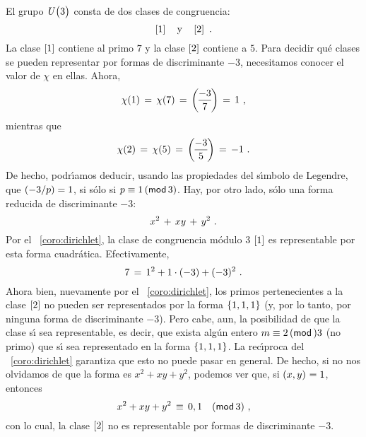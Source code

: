 \begin{ejemDirichlet}\label{ejem:dirichlet:representacion:tres}
	El grupo $\Unidadesmod[3]$ consta de dos clases de congruencia:
	\begin{displaymath}
		\clase 1\dispand\clase 2
		\dispstop
	\end{displaymath}
	La clase $\clase 1$ contiene al primo $7$ y la clase
	$\clase 2$ contiene a $5$. Para decidir qu\'e clases
	se pueden representar por formas de discriminante $-3$,
	necesitamos conocer el valor de $\chi$ en ellas.
	Ahora,
	\begin{displaymath}
		\chi(1)\,=\,\chi(7)\,=\,\legendre{-3} 7\,=\,1
		\dispcomma
	\end{displaymath}
	mientras que
	\begin{displaymath}
		\chi(2)\,=\,\chi(5)\,=\,\legendre{-3} 5\,=\,-1
		\dispstop
	\end{displaymath}
	De hecho, podr\'{\i}amos deducir, usando las propiedades del
	s\'{\i}mbolo de Legendre, que $\tlegendre{-3} p=1$, si s\'olo si
	$p\equiv 1\tmodulo[3]$.
	Hay, por otro lado, s\'olo una forma reducida de discriminante
	$-3$:
	\begin{displaymath}
		x^2\,+\,xy\,+\,y^2
		\dispstop
	\end{displaymath}
	Por el \coroname~\ref{coro:dirichlet}, la clase de congruencia
	m\'odulo $3$ $\clase 1$ es representable por esta forma
	cuadr\'atica. Efectivamente,
	\begin{displaymath}
		7\,=\,1^2+1\cdot (-3)+(-3)^2
		\dispstop
	\end{displaymath}
	Ahora bien, nuevamente por el \coroname~\ref{coro:dirichlet},
	los primos pertenecientes a la clase $\clase 2$ no pueden
	ser representados por la forma $\binaria{1,1,1}$
	(y, por lo tanto, por ninguna forma de discriminante $-3$).
	Pero cabe, aun, la posibilidad de que la clase s\'{\i} sea
	representable, es decir, que exista alg\'un entero
	$m\equiv 2\tmodulo 3$ (no primo) que s\'{\i} sea representado
	en la forma $\binaria{1,1,1}$. La rec\'{\i}proca del
	\coroname~\ref{coro:dirichlet} garantiza que esto no puede
	pasar en general. De hecho, si no nos olvidamos de que la
	forma es $x^2+xy+y^2$, podemos ver que, si $\mcd{x,y}=1$, entonces
	\begin{displaymath}
		x^2+xy+y^2\,\equiv\,0,1\modulo[3]
		\dispcomma
	\end{displaymath}
	con lo cual, la clase $\clase 2$ no es representable por
	formas de discriminante $-3$.
\end{ejemDirichlet}

